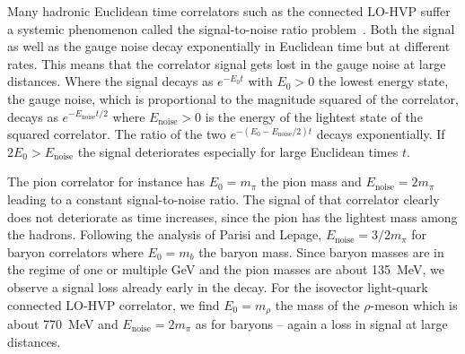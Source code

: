 Many hadronic Euclidean time correlators such as the connected LO-HVP suffer a systemic phenomenon called the signal-to-noise ratio problem~\cite{parisi1984,lepage1989}.
Both the signal as well as the gauge noise decay exponentially in Euclidean time but at different rates.
This means that the correlator signal gets lost in the gauge noise at large distances.
Where the signal decays as $e^{-E_0 t}$ with $E_0 > 0$ the lowest energy state, the gauge noise, which is proportional to the magnitude squared of the correlator, decays as $e^{-E_{\text{noise}}t/2}$ where $E_{\text{noise}} > 0$ is the energy of the lightest state of the squared correlator.
The ratio of the two $e^{-(E_0 - E_{\text{noise}}/2)t}$ decays exponentially.
If $2E_0 > E_{\text{noise}}$ the signal deteriorates especially for large Euclidean times $t$.

The pion correlator for instance has $E_0 = m_{\pi}$ the pion mass and $E_{\text{noise}} = 2 m_{\pi}$ leading to a constant signal-to-noise ratio.
The signal of that correlator clearly does not deteriorate as time increases, since the pion has the lightest mass among the hadrons.
Following the analysis of Parisi and Lepage, $E_{\text{noise}} = 3/2 m_{\pi}$ for baryon correlators where $E_0 = m_{b}$ the baryon mass.
Since baryon masses are in the regime of one or multiple GeV and the pion masses are about \SI{135}{\mega \eV}, we observe a signal loss already early in the decay.
For the isovector light-quark connected LO-HVP correlator, we find $E_0 = m_{\rho}$ the mass of the $\rho$-meson which is about \SI{770}{\mega \eV} and $E_{\text{noise}} = 2 m_{\pi}$ as for baryons -- again a loss in signal at large distances.

